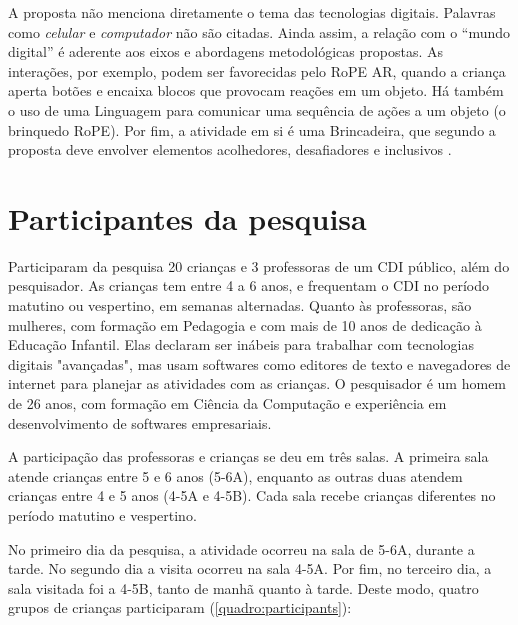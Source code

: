 A proposta não menciona diretamente o tema das tecnologias digitais. Palavras como \textit{celular} e \textit{computador} não são citadas. Ainda assim, a relação com o “mundo digital” é aderente aos eixos e abordagens metodológicas propostas. As interações, por exemplo, podem ser favorecidas pelo RoPE AR, quando a criança aperta botões e encaixa blocos que provocam reações em um objeto. Há também o uso de uma Linguagem para comunicar uma sequência de ações a um objeto (o brinquedo RoPE). Por fim, a atividade em si é uma Brincadeira, que segundo a proposta deve envolver elementos acolhedores, desafiadores e inclusivos \cite[p.50]{gaspar_proposta_2010}.




\section{Participantes da pesquisa}
\label{sec:participantes}

Participaram da pesquisa 20 crianças e 3 professoras de um CDI público, além do pesquisador. As crianças tem entre 4 a 6 anos, e frequentam o CDI no período matutino ou vespertino, em semanas alternadas. Quanto às professoras, são mulheres, com formação em Pedagogia e com mais de 10 anos de dedicação à Educação Infantil. Elas declaram ser inábeis para trabalhar com tecnologias digitais "avançadas", mas usam softwares como editores de texto e navegadores de internet para planejar as atividades com as crianças. O pesquisador é um homem de 26 anos, com formação em Ciência da Computação e experiência em desenvolvimento de softwares empresariais.

A participação das professoras e crianças se deu em três salas. A primeira sala atende crianças entre 5 e 6 anos (5-6A), enquanto as outras duas atendem crianças entre 4 e 5 anos (4-5A e 4-5B). Cada sala recebe crianças diferentes no período matutino e vespertino.

No primeiro dia da pesquisa, a atividade ocorreu na sala de 5-6A, durante a tarde. No segundo dia a visita ocorreu na sala 4-5A. Por fim, no terceiro dia, a sala visitada foi a 4-5B, tanto de manhã quanto à tarde. Deste modo, quatro grupos de crianças participaram (\autoref{quadro:participants}):

